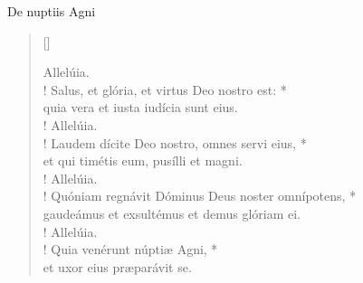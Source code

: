 


\def\greinitialformat#1{%
{\fontsize{39}{39}\selectfont #1}%
}




\vspace{0.3cm}
\begin{center}

De nuptiis Agni\\
\end{center}
\begin{verse}[\versewidth]


Allelúia.\\!
Salus, et glória, et virtus Deo nostro est: *\\
quia vera et iusta iudícia sunt eius.\\!
Allelúia.\\!
Laudem dícite Deo nostro, omnes servi eius, *\\
et qui timétis eum, pusílli et magni.\\!
Allelúia.\\!
Quóniam regnávit Dóminus
	Deus noster omnípotens, *\\
gaudeámus et exsultémus et demus glóriam ei.\\!
Allelúia.\\!
Quia venérunt núptiæ Agni, *\\
et uxor eius præparávit se.\\
\end{verse}
\vspace{1cm}


